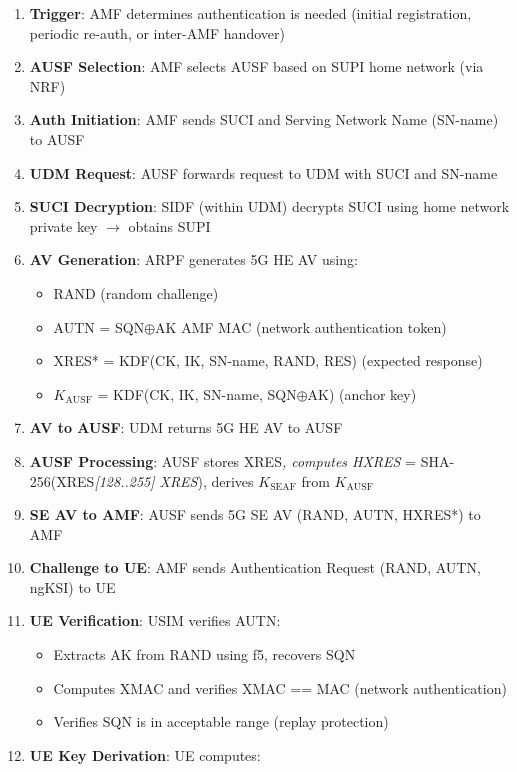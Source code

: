 \begin{enumerate}
\def\labelenumi{\arabic{enumi}.}
\tightlist
\item
  \textbf{Trigger}: AMF determines authentication is needed (initial registration, periodic re-auth, or inter-AMF handover)
\item
  \textbf{AUSF Selection}: AMF selects AUSF based on SUPI home network (via NRF)
\item
  \textbf{Auth Initiation}: AMF sends SUCI and Serving Network Name (SN-name) to AUSF
\item
  \textbf{UDM Request}: AUSF forwards request to UDM with SUCI and SN-name
\item
  \textbf{SUCI Decryption}: SIDF (within UDM) decrypts SUCI using home network private key \ensuremath{\to} obtains SUPI
\item
  \textbf{AV Generation}: ARPF generates 5G HE AV using:

  \begin{itemize}
  \tightlist
  \item
    RAND (random challenge)
  \item
    AUTN = SQN\ensuremath{\oplus}AK \textbar{}\textbar{} AMF \textbar{}\textbar{} MAC (network authentication token)
  \item
    XRES* = KDF(CK, IK, SN-name, RAND, RES) (expected response)
  \item
    \ensuremath{K_{\mathrm{AUSF}}} = KDF(CK, IK, SN-name, SQN\ensuremath{\oplus}AK) (anchor key)
  \end{itemize}
\item
  \textbf{AV to AUSF}: UDM returns 5G HE AV to AUSF
\item
  \textbf{AUSF Processing}: AUSF stores XRES\emph{, computes HXRES} = SHA-256(XRES\emph{[128..255] \textbar{}\textbar{} XRES}), derives \ensuremath{K_{\mathrm{SEAF}}} from \ensuremath{K_{\mathrm{AUSF}}}
\item
  \textbf{SE AV to AMF}: AUSF sends 5G SE AV (RAND, AUTN, HXRES*) to AMF
\item
  \textbf{Challenge to UE}: AMF sends Authentication Request (RAND, AUTN, ngKSI) to UE
\item
  \textbf{UE Verification}: USIM verifies AUTN:

  \begin{itemize}
  \tightlist
  \item
    Extracts AK from RAND using f5, recovers SQN
  \item
    Computes XMAC and verifies XMAC == MAC (network authentication)
  \item
    Verifies SQN is in acceptable range (replay protection)
  \end{itemize}
\item
  \textbf{UE Key Derivation}: UE computes:


\end{enumerate}
